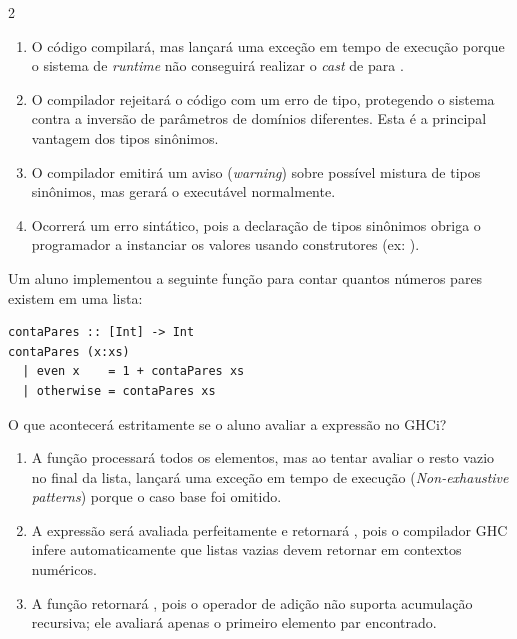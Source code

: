 \documentclass[a4paper,10pt,brazil]{article}
\begin{document}
\begin{multicols}{2}
\begin{enumerate}
  \item O código compilará, mas lançará uma exceção em tempo de execução porque o sistema de \emph{runtime} não conseguirá realizar o \emph{cast} de  para .

  \item O compilador rejeitará o código com um erro de tipo, protegendo o sistema contra a inversão de parâmetros de domínios diferentes. Esta é a principal vantagem dos tipos sinônimos.

  \item O compilador emitirá um aviso (\emph{warning}) sobre possível mistura de tipos sinônimos, mas gerará o executável normalmente.

  \item Ocorrerá um erro sintático, pois a declaração de tipos sinônimos obriga o programador a instanciar os valores usando construtores (ex: ).


\end{enumerate}

Um aluno implementou a seguinte função para contar quantos números pares existem em uma lista:

\begin{verbatim}
contaPares :: [Int] -> Int
contaPares (x:xs)
  | even x    = 1 + contaPares xs
  | otherwise = contaPares xs
\end{verbatim}

O que acontecerá estritamente se o aluno avaliar a expressão  no GHCi?

\begin{enumerate}
  \item A função processará todos os elementos, mas ao tentar avaliar o resto vazio no final da lista, lançará uma exceção em tempo de execução (\emph{Non-exhaustive patterns}) porque o caso base  foi omitido.

  \item A expressão será avaliada perfeitamente e retornará , pois o compilador GHC infere automaticamente que listas vazias devem retornar  em contextos numéricos.

  \item A função retornará , pois o operador de adição não suporta acumulação recursiva; ele avaliará apenas o primeiro elemento par encontrado.


\end{enumerate}
\end{multicols}
\end{document}
